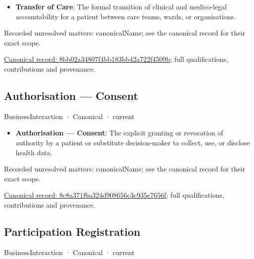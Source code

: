 \begin{itemize}


\item \textbf{Transfer of Care}: The formal transition of clinical and medico-legal accountability for a patient between care teams, wards, or organisations.

\end{itemize}

{\small Recorded unresolved matters: canonicalName; see the canonical record for their exact scope.}\par
{\footnotesize \href{../../../../continuum/business/business-interaction/8bb02a34807f4bb183bb42a722f4509b.md}{Canonical record: 8bb02a34807f4bb183bb42a722f4509b}; full qualifications, contributions and provenance.}\par
\subsection{Authorisation — Consent}

\label{element:8c8a371f6a324d908656c3c935c7656f}
{\small BusinessInteraction · Canonical · current}\par

\begin{itemize}


\item \textbf{Authorisation — Consent}: The explicit granting or revocation of authority by a patient or substitute decision-maker to collect, use, or disclose health data.

\end{itemize}

{\small Recorded unresolved matters: canonicalName; see the canonical record for their exact scope.}\par
{\footnotesize \href{../../../../continuum/business/business-interaction/8c8a371f6a324d908656c3c935c7656f.md}{Canonical record: 8c8a371f6a324d908656c3c935c7656f}; full qualifications, contributions and provenance.}\par
\subsection{Participation Registration}

\label{element:906c61eb392f4b538f6d0a79917d21cc}
{\small BusinessInteraction · Canonical · current}\par

